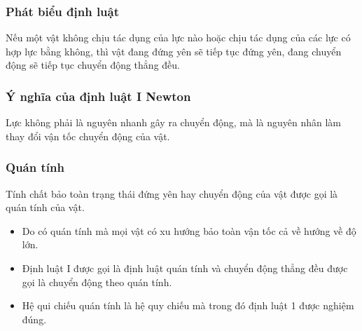 \subsubsection{Phát biểu định luật}
Nếu một vật không chịu tác dụng của lực nào hoặc chịu tác dụng của các lực có hợp lực bằng không, thì vật đang đứng yên sẽ tiếp tục đứng yên, đang chuyển động sẽ tiếp tục chuyển động thẳng đều.
\subsubsection{Ý nghĩa của định luật I Newton}
Lực không phải là nguyên nhanh gây ra chuyển động, mà là nguyên nhân làm thay đổi vận tốc chuyển động của vật.
\subsubsection{Quán tính}
Tính chất bảo toàn trạng thái đứng yên hay chuyển động của vật được gọi là quán tính của vật.
\begin{itemize}
	\item Do có quán tính mà mọi vật có xu hướng bảo toàn vận tốc cả về hướng về độ lớn.
	\item Định luật I được gọi là định luật quán tính và chuyển động thẳng đều được gọi là chuyển động theo quán tính.
	\item Hệ qui chiếu quán tính là hệ quy chiếu mà trong đó định luật 1 được nghiệm đúng. 
\end{itemize}
